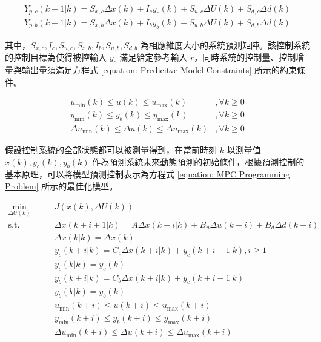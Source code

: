 \begin{equation}\label{equation: Future p Steps Predicitve Model}
  \begin{aligned}
    Y_{p, c} (k+1 | k) = S_{x, c} \Delta x(k) + I_{c} y_{c} (k) + S_{u, c} \Delta U(k) + S_{d, c} \Delta d(k) \\
    Y_{p, b} (k+1 | k) = S_{x, b} \Delta x(k) + I_{b} y_{b} (k) + S_{u, b} \Delta U(k) + S_{d, b} \Delta d(k)
  \end{aligned}
\end{equation}

其中，$S_{x, c}, I_{c}, S_{u, c}, S_{x, b}, I_{b}, S_{u, b}, S_{d, b}$ 為相應維度大小的系統預測矩陣。該控制系統的控制目標為使得被控輸入 $y_{c}$ 滿足給定參考輸入 $r$，同時系統的控制量、控制增量與輸出量須滿足方程式 \eqref{equation: Predicitve Model Constraints} 所示的約束條件。

\begin{equation}\label{equation: Predicitve Model Constraints}
  \begin{aligned}
    u_{\min} (k) \leq u(k) \leq u_{\max} (k) &, \forall k \geq 0 \\
    y_{\min} (k) \leq y_{b}(k) \leq y_{\max} (k) &, \forall k \geq 0 \\
    \Delta u_{\min} (k) \leq \Delta u(k) \leq \Delta u_{\max} (k) &, \forall k \geq 0
  \end{aligned}
\end{equation}

假設控制系統的全部狀態都可以被測量得到，在當前時刻 $k$ 以測量值 $x(k), y_{c}(k), y_{b}(k)$ 作為預測系統未來動態預測的初始條件，根據預測控制的基本原理，可以將模型預測控制表示為方程式 \eqref{equation: MPC Programming Problem} 所示的最佳化模型。

\begin{equation}\label{equation: MPC Programming Problem}
  \begin{aligned}
    \min_{\Delta U(k)} \qquad & J(x(k), \Delta U(k)) \\
    \text{s.t.}        \qquad & \Delta x(k+i+1 | k) = A\Delta x(k+i|k) + B_{u} \Delta u(k+i) + B_{d} \Delta d(k + i) \\
                              & \Delta x(k|k) = \Delta x(k) \\
                              & y_{c} (k+i|k) = C_{c} \Delta x(k+i|k) + y_{c} (k+i-1|k), i \geq 1 \\
                              & y_{c} (k|k) = y_{c}(k) \\
                              & y_{b} (k+i|k) = C_{b} \Delta x(k+i|k) + y_{c} (k+i-1|k) \\
                              & y_{b} (k|k) = y_{b}(k) \\
                              & u_{\min} (k+i) \leq u(k+i) \leq u_{\max} (k+i) \\
                              & y_{\min} (k+i) \leq y_{b}(k+i) \leq y_{\max} (k+i) \\
                              & \Delta u_{\min} (k+i) \leq \Delta u(k+i) \leq \Delta u_{\max} (k+i)
  \end{aligned}
\end{equation}

